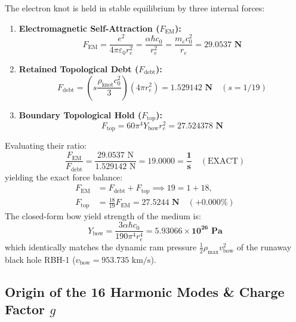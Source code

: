\documentclass[11pt,a4paper]{article}
\begin{document}
The electron knot is held in stable equilibrium by three internal forces:
\begin{enumerate}
    \item \textbf{Electromagnetic Self-Attraction ($F_{\text{EM}}$):}
    \begin{equation}
    F_{\text{EM}} = \frac{e^2}{4\pi\varepsilon_0 r_e^2} = \frac{\alpha\hbar c_0}{r_e^2} = \frac{m_e c_0^2}{r_e} = \mathbf{29.0537\text{ N}}
    \end{equation}
    \item \textbf{Retained Topological Debt ($F_{\text{debt}}$):}
    \begin{equation}
    F_{\text{debt}} = \left(s \frac{\rho_{\text{knot}} c_0^2}{3}\right) \left(4\pi r_e^2\right) = \mathbf{1.529142\text{ N}} \quad (s = 1/19)
    \end{equation}
    \item \textbf{Boundary Topological Hold ($F_{\text{top}}$):}
    \begin{equation}
    F_{\text{top}} = 60\pi^4 Y_{\text{bow}} r_e^2 = \mathbf{27.524378\text{ N}}
    \end{equation}
\end{enumerate}

Evaluating their ratio:
\begin{equation}
\frac{F_{\text{EM}}}{F_{\text{debt}}} = \frac{29.0537\text{ N}}{1.529142\text{ N}} = \mathbf{19.0000 = \frac{1}{s}} \quad (\text{EXACT})
\end{equation}
yielding the exact force balance:
\begin{equation}
\boxed{\begin{aligned} F_{\text{EM}} &= F_{\text{debt}} + F_{\text{top}} \implies 19 = 1 + 18, \\ F_{\text{top}} &= \frac{18}{19} F_{\text{EM}} = \mathbf{27.5244\text{ N}} \quad (\mathbf{+0.000\%}) \end{aligned}}
\end{equation}
The closed-form bow yield strength of the medium is:
\begin{equation}
\boxed{Y_{\text{bow}} = \frac{3\alpha\hbar c_0}{190\pi^4 r_e^4} = \mathbf{5.93066 \times 10^{26}\text{ Pa}}}
\end{equation}
which identically matches the dynamic ram pressure $\frac{1}{2}\rho_{\max} v_{\text{bow}}^2$ of the runaway black hole RBH-1 ($v_{\text{bow}} = 953.735\text{ km/s}$).

\subsection{Origin of the 16 Harmonic Modes \& Charge Factor $g$}
\label{subsec:sixteen_modes}
\end{document}
